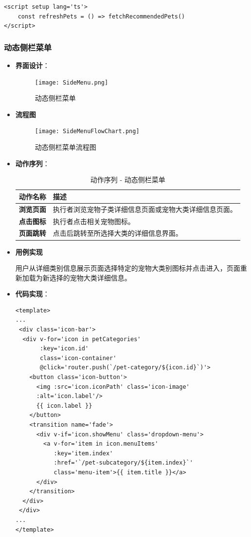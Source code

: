 \begin{itemize}
	\begin{verbatim}
<script setup lang='ts'>
	const refreshPets = () => fetchRecommendedPets()
</script>
	\end{verbatim}
\end{itemize}

\subsubsection{动态侧栏菜单}

\begin{itemize}
	\item \textbf{界面设计}：
	\begin{figure}[H]
		\centering
		\texttt{[image: SideMenu.png]}
		\caption{动态侧栏菜单}
		\label{动态侧栏菜单}
	\end{figure}
	
	\item \textbf{流程图}
	
	\begin{figure}[H]
		\centering
		\texttt{[image: SideMenuFlowChart.png]}
		\caption{动态侧栏菜单流程图}
		\label{动态侧栏菜单流程图}
	\end{figure}
	
	\item \textbf{动作序列}：
	\begin{table}[H]
		\centering
		\caption{动作序列 - 动态侧栏菜单}
		\renewcommand\arraystretch{1.5}
		\begin{tabular}{|c|>{\raggedright\arraybackslash}p{10cm}|}
			\hline
			\textbf{动作名称} & \textbf{描述} \\ \hline
			\textbf{浏览页面} & 执行者浏览宠物子类详细信息页面或宠物大类详细信息页面。\\ \hline
			\textbf{点击图标} & 执行者点击相关宠物图标。\\ \hline
			\textbf{页面跳转} & 点击后跳转至所选择大类的详细信息界面。\\ \hline
		\end{tabular}
	\end{table}
	
	\item \textbf{用例实现}
	
	用户从详细类别信息展示页面选择特定的宠物大类别图标并点击进入，页面重新加载为新选择的宠物大类详细信息。
	
	\item \textbf{代码实现}：
	\begin{verbatim}
<template>
...
 <div class='icon-bar'>
  <div v-for='icon in petCategories'
       :key='icon.id'
       class='icon-container'
       @click='router.push(`/pet-category/${icon.id}`)'>
    <button class='icon-button'>
      <img :src='icon.iconPath' class='icon-image' 
      :alt='icon.label'/>
      {{ icon.label }}
    </button>
    <transition name='fade'>
      <div v-if='icon.showMenu' class='dropdown-menu'>
        <a v-for='item in icon.menuItems'
           :key='item.index'
           :href='`/pet-subcategory/${item.index}`'
           class='menu-item'>{{ item.title }}</a>
      </div>
    </transition>
  </div>
 </div>
...
</template>
	\end{verbatim}
	

\end{itemize}
